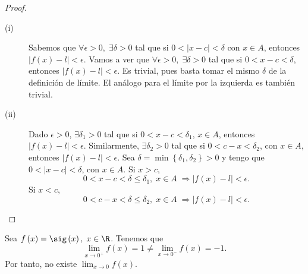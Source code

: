 \begin{proof}
\begin{description}
\item[(i)] Sabemos que $\displaystyle \forall \epsilon > 0, \; \exists \delta > 0 $ tal que si $\displaystyle 0<\left|x-c\right|<\delta  $ con $\displaystyle x \in A $, entonces $\displaystyle \left|f\left(x\right)-l\right|<\epsilon  $. Vamos a ver que $\displaystyle \forall \epsilon > 0, \; \exists \delta > 0 $ tal que si $\displaystyle 0 < x - c < \delta  $, entonces $\displaystyle \left|f\left(x\right)-l\right|<\epsilon  $. Es trivial, pues basta tomar el mismo $\displaystyle \delta  $ de la definición de límite. El análogo para el límite por la izquierda es también trivial.
\item[(ii)] Dado $\displaystyle \epsilon > 0 $, $\displaystyle \exists \delta_{1} > 0 $ tal que si $\displaystyle 0 < x-c<\delta_{1} $, $\displaystyle x \in A $, entonces $\displaystyle \left|f\left(x\right)-l\right|<\epsilon  $. Similarmente, $\displaystyle \exists\delta_{2} > 0 $ tal que si $\displaystyle 0 < c - x < \delta _{2} $, con $\displaystyle x \in A $, entonces $\displaystyle \left|f\left(x\right)-l\right|<\epsilon  $. Sea $\displaystyle \delta = \min \left\{ \delta_{1}, \delta_{2}\right\} >0 $ y tengo que $\displaystyle 0 < \left|x-c\right|<\delta  $, con $\displaystyle x \in A $. Si $\displaystyle x > c $,
	\[0 < x - c < \delta \leq \delta_{1}, \; x \in A\; \Rightarrow \left|f\left(x\right)-l\right|<\epsilon  .\]
Si $\displaystyle x < c$,
\[0 < c - x < \delta \leq \delta_{2}, \; x \in A\; \Rightarrow \left|f\left(x\right)-l\right|<\epsilon  .\]
\end{description}
\end{proof}

\begin{eg}
\normalfont Sea $\displaystyle f\left(x\right) = \sig\left(x\right), \; x \in \R $. Tenemos que 
\[\lim_{x \to 0^{+}}f\left(x\right) = 1 \neq \lim_{x \to 0^{-}}f\left(x\right) = -1 .\]
Por tanto, no existe $\displaystyle \lim_{x \to 0}f\left(x\right) $.
\end{eg}

